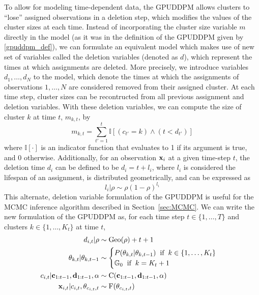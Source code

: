 \documentclass[twocolumn, final]{svjour3}
\begin{document}
To allow for modeling time-dependent data, the GPUDDPM allows clusters to ``lose'' assigned observations in a deletion step, which modifies the values of the cluster sizes at each time. Instead of incorporating the cluster size variable $m$ directly in the model (as it was in the definition of the GPUDDPM given by \eqref{gpuddpm_def}), we can formulate an equivalent model which makes use of new set of variables called the deletion variables (denoted as $d$), which represent the times at which assignments are deleted. More precisely, we introduce variables $d_{1}, \ldots, d_{N}$ to the model, which denote the times at which the assignments of observations $1, \ldots, N$ are considered removed from their assigned cluster. At each time step, cluster sizes can be recontructed from all previous assignment and deletion variables. With these deletion variables, we can compute the size of cluster $k$ at time $t$, $m_{k,t}$, by
\begin{equation}
\label{compute_clust_size}
m_{k,t} = \sum_{t' = 1}^{t} \mathbb{I}[(c_{t'}=k) \wedge (t < d_{t'})]
\end{equation}
where $\mathbb{I}[\cdot]$ is an indicator function that evaluates to 1 if its argument is true, and 0 otherwise. Additionally, for an observation $\bold{x}_{i}$ at a given time-step $t$, the deletion time $d_{i}$ can be defined to be $d_{i} = t + l_{i}$, where $l_{i}$ is considered the lifespan of an assignment, is distributed geometrically, and can be expressed as
\begin{equation}
\label{del_rho_form}
l_{i} | \rho  \sim  \rho(1 - \rho)^{l_{i}}
\end{equation}
This alternate, deletion variable formulation of the GPUDDPM is useful for the MCMC inference algorithm described in Section~\ref{sec:MCMC}. We can write the new formulation of the GPUDDPM as, for each time step $t \in \{1, \ldots, T\}$ and clusters $k \in \{ 1, \ldots, K_{t} \} $ at time $t$,
\begin{align}
\begin{split}
d_{i,t} | \rho  &\sim \text{Geo}(\rho) + t + 1 \\
\theta_{k, t} | \theta_{k, t-1}  &\sim
\begin{cases}
P(\theta_{k,t} | \theta_{k,t-1}) \hspace{2mm} \text{if} \hspace{2mm} k \in \{ 1, \ldots, K_{t} \} \\
\mathbb{G}_{0} \hspace{2mm} \text{if} \hspace{2mm} k = K_{t} + 1
\end{cases} \\
c_{i,t} | \bold{c}_{1:t-1}, \bold{d}_{1:t-1}, \alpha  &\sim  \text{C}(\bold{c}_{1:t-1}, \bold{d}_{1:t-1}, \alpha) \\
\bold{x}_{i,t} | c_{i,t}, \theta_{c_{i,t},t}  &\sim  \text{F}(\theta_{c_{i,t}, t})
\end{split}
\end{align}
\end{document}
